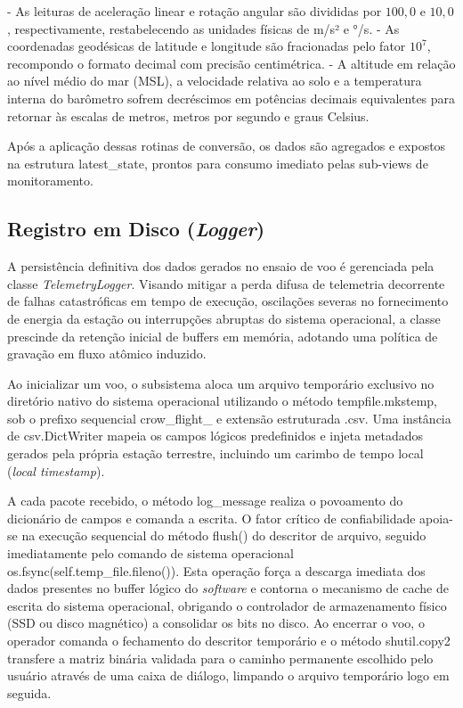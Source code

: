   - As leituras de aceleração linear e rotação angular são divididas por $100,0$ e $10,0$, respectivamente, restabelecendo as unidades físicas de m/s² e °/s.
  - As coordenadas geodésicas de latitude e longitude são fracionadas pelo fator $10^7$, recompondo o formato decimal com precisão centimétrica.
  - A altitude em relação ao nível médio do mar (MSL), a velocidade relativa ao solo e a temperatura interna do barômetro sofrem decréscimos em potências decimais equivalentes para retornar às escalas de metros, metros por segundo e graus Celsius.

Após a aplicação dessas rotinas de conversão, os dados são agregados e expostos na estrutura latest\_state, prontos para consumo imediato pelas sub-views de monitoramento.

\subsection{Registro em Disco (\textit{Logger})}

A persistência definitiva dos dados gerados no ensaio de voo é gerenciada pela classe \textit{TelemetryLogger}. Visando mitigar a perda difusa de telemetria decorrente de falhas catastróficas em tempo de execução, oscilações severas no fornecimento de energia da estação ou interrupções abruptas do sistema operacional, a classe prescinde da retenção inicial de buffers em memória, adotando uma política de gravação em fluxo atômico induzido.

Ao inicializar um voo, o subsistema aloca um arquivo temporário exclusivo no diretório nativo do sistema operacional utilizando o método tempfile.mkstemp, sob o prefixo sequencial crow\_flight\_ e extensão estruturada .csv. Uma instância de csv.DictWriter mapeia os campos lógicos predefinidos e injeta metadados gerados pela própria estação terrestre, incluindo um carimbo de tempo local (\textit{local timestamp}).

A cada pacote recebido, o método log\_message realiza o povoamento do dicionário de campos e comanda a escrita. O fator crítico de confiabilidade apoia-se na execução sequencial do método flush() do descritor de arquivo, seguido imediatamente pelo comando de sistema operacional os.fsync(self.temp\_file.fileno()). Esta operação força a descarga imediata dos dados presentes no buffer lógico do \textit{software} e contorna o mecanismo de cache de escrita do sistema operacional, obrigando o controlador de armazenamento físico (SSD ou disco magnético) a consolidar os bits no disco. Ao encerrar o voo, o operador comanda o fechamento do descritor temporário e o método shutil.copy2 transfere a matriz binária validada para o caminho permanente escolhido pelo usuário através de uma caixa de diálogo, limpando o arquivo temporário logo em seguida.

